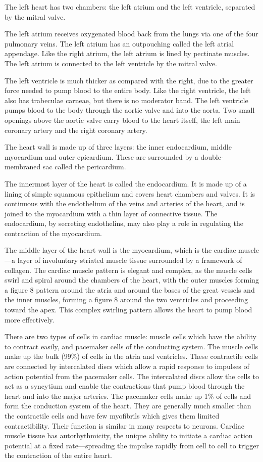 The left heart has two chambers: the left atrium and the left ventricle, separated by the mitral valve.

The left atrium receives oxygenated blood back from the lungs via one of the four pulmonary veins. The left atrium has an outpouching called the left atrial appendage. Like the right atrium, the left atrium is lined by pectinate muscles. The left atrium is connected to the left ventricle by the mitral valve.

The left ventricle is much thicker as compared with the right, due to the greater force needed to pump blood to the entire body. Like the right ventricle, the left also has trabeculae carneae, but there is no moderator band. The left ventricle pumps blood to the body through the aortic valve and into the aorta. Two small openings above the aortic valve carry blood to the heart itself, the left main coronary artery and the right coronary artery.

The heart wall is made up of three layers: the inner endocardium, middle myocardium and outer epicardium. These are surrounded by a double-membraned sac called the pericardium.

The innermost layer of the heart is called the endocardium. It is made up of a lining of simple squamous epithelium and covers heart chambers and valves. It is continuous with the endothelium of the veins and arteries of the heart, and is joined to the myocardium with a thin layer of connective tissue. The endocardium, by secreting endothelins, may also play a role in regulating the contraction of the myocardium.

The middle layer of the heart wall is the myocardium, which is the cardiac muscle---a layer of involuntary striated muscle tissue surrounded by a framework of collagen. The cardiac muscle pattern is elegant and complex, as the muscle cells swirl and spiral around the chambers of the heart, with the outer muscles forming a figure 8 pattern around the atria and around the bases of the great vessels and the inner muscles, forming a figure 8 around the two ventricles and proceeding toward the apex. This complex swirling pattern allows the heart to pump blood more effectively.

There are two types of cells in cardiac muscle: muscle cells which have the ability to contract easily, and pacemaker cells of the conducting system. The muscle cells make up the bulk (99\%) of cells in the atria and ventricles. These contractile cells are connected by intercalated discs which allow a rapid response to impulses of action potential from the pacemaker cells. The intercalated discs allow the cells to act as a syncytium and enable the contractions that pump blood through the heart and into the major arteries. The pacemaker cells make up 1\% of cells and form the conduction system of the heart. They are generally much smaller than the contractile cells and have few myofibrils which gives them limited contractibility. Their function is similar in many respects to neurons. Cardiac muscle tissue has autorhythmicity, the unique ability to initiate a cardiac action potential at a fixed rate---spreading the impulse rapidly from cell to cell to trigger the contraction of the entire heart.

